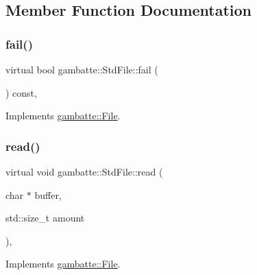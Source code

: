 \subsection{Member Function Documentation}
\mbox{\label{classgambatte_1_1StdFile_aa4f8f0f2854e3b11a71cb3d3109908eb}} 
\subsubsection{\texorpdfstring{fail()}{fail()}}
{\footnotesize\ttfamily virtual bool gambatte\+::\+Std\+File\+::fail (\begin{DoxyParamCaption}{ }\end{DoxyParamCaption}) const\hspace{0.3cm}{\ttfamily [inline]}, {\ttfamily [virtual]}}



Implements \hyperlink{classgambatte_1_1File_ac4e6a7055cd91176c9fb3e9215370c51}{gambatte\+::\+File}.

\mbox{\label{classgambatte_1_1StdFile_a8c9c0994af30457e852ee887c1f9b38c}} 
\subsubsection{\texorpdfstring{read()}{read()}}
{\footnotesize\ttfamily virtual void gambatte\+::\+Std\+File\+::read (\begin{DoxyParamCaption}\item[{char $\ast$}]{buffer,  }\item[{std\+::size\+\_\+t}]{amount }\end{DoxyParamCaption})\hspace{0.3cm}{\ttfamily [inline]}, {\ttfamily [virtual]}}



Implements \hyperlink{classgambatte_1_1File_a58a6f97f55c93d15c9aa067d2a6db123}{gambatte\+::\+File}.

\mbox{\label{classgambatte_1_1StdFile_aa9f4ffbac979a4bf7607992eff78f469}} 
